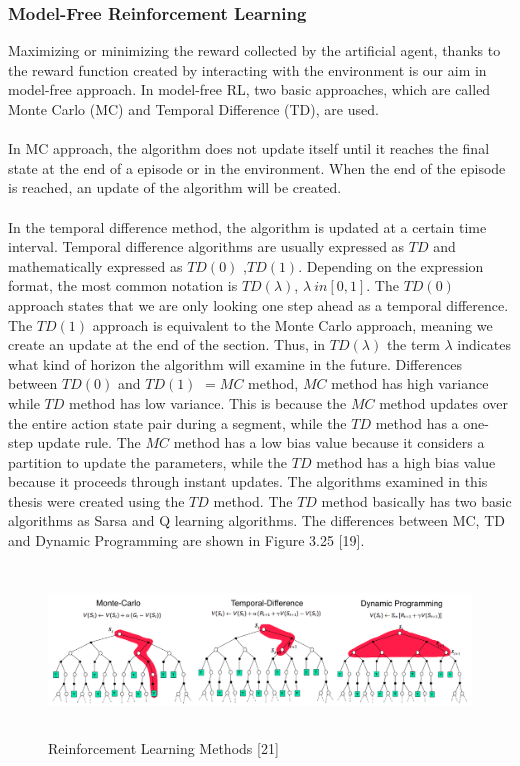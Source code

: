 \documentclass[12pt,twoside,a4]{mwbk}
\begin{document}
\subsubsection{Model-Free Reinforcement Learning}
Maximizing or minimizing the reward collected by the artificial agent, thanks to the reward function created by interacting with the environment is our aim in model-free approach. In model-free RL, two basic approaches, which are called Monte Carlo (MC) and Temporal Difference (TD), are used. 
\\ \\
In MC approach, the algorithm does not update itself until it reaches the final state at the end of a episode or in the environment. When the end of the episode is reached, an update of the algorithm will be created.
\\ \\
In the temporal difference method, the algorithm is updated at a certain time interval. Temporal difference algorithms are usually expressed as $TD$ and mathematically expressed as $TD(0)$ ,$TD(1)$. Depending on the expression format, the most common notation is $TD(\lambda)$, $\lambda \ in [0,1]$. The $TD(0)$ approach states that we are only looking one step ahead as a temporal difference. The $TD(1)$ approach is equivalent to the Monte Carlo approach, meaning we create an update at the end of the section. Thus, in $TD(\lambda)$ the term $\lambda$ indicates what kind of horizon the algorithm will examine in the future. Differences between $TD(0)$ and $TD(1)$ $= MC$ method, $MC$ method has high variance while $TD$ method has low variance. This is because the $MC$ method updates over the entire action state pair during a segment, while the $TD$ method has a one-step update rule. The $MC$ method has a low bias value because it considers a partition to update the parameters, while the $TD$ method has a high bias value because it proceeds through instant updates. The algorithms examined in this thesis were created using the $TD$ method. The $TD$ method basically has two basic algorithms as Sarsa and Q learning algorithms. The differences between MC, TD and Dynamic Programming are shown in Figure 3.25 [19].
\begin{figure}[h]
    \centering
    \includegraphics[width=16.0 cm, height=4.5cm]{TD_MC_DP.png}
    \caption{Reinforcement Learning Methods [21]}
\end{figure}
\end{document}
